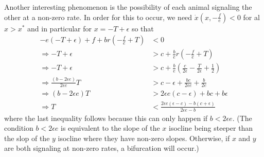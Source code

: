 \documentclass{article}
\begin{document}
Another interesting phenomenon is the possibility of each animal signaling the other at a non-zero rate.  In order for this to occur, we need $\dot{x}(x,-\frac{f}{e})<0$ for al $x>x^*$ and in particular for $x=-T+\epsilon$ so that
\begin{align*}
-e(-T+\epsilon)+f+br(-\frac{f}{e}+T)&<0
\\ \Rightarrow-T+\epsilon&>c+\frac{b}{e}r(-\frac{f}{e}+T)
\\ \Rightarrow -T+\epsilon&>c+\frac{b}{e}\left(\frac{c}{2\epsilon}-\frac{T}{2\epsilon}+\frac{1}{2}\right)
\\ \Rightarrow \frac{(b-2\epsilon e)}{2\epsilon e}T&>c-\epsilon+\frac{bc}{2\epsilon e}+\frac{b}{2e}
\\ \Rightarrow (b-2\epsilon e)T&>2\epsilon e(c-\epsilon)+bc+b\epsilon
\\ \Rightarrow T&<\frac{2\epsilon e(\epsilon -c)-b(c+\epsilon)}{2\epsilon e-b} 
\end{align*}
where the last inequality follows because this can only happen if $b<2\epsilon e$.  (The condition $b<2\epsilon e$ is equivalent to the slope of the $x$ isocline being steeper than the slop of the $y$ isocline where they have non-zero slopes.  Otherwise, if $x$ and $y$ are both signaling at non-zero rates, a bifurcation will occur.)
\end{document}

